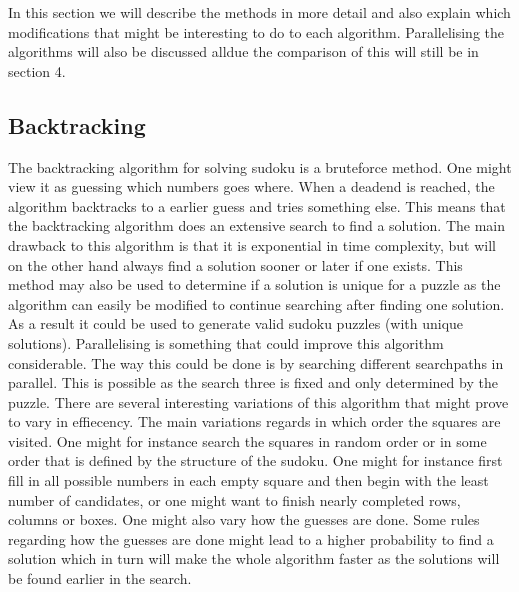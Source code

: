 \documentclass[a4paper,11pt]{kth-mag}
\begin{document}
In this section we will describe the methods in more detail and also explain which modifications that might be interesting to do to each algorithm. Parallelising the algorithms will also be discussed alldue the comparison of this will still be in section 4.

\subsection{Backtracking}

The backtracking algorithm for solving sudoku is a bruteforce method. One might view it as guessing which numbers goes where. When a deadend is reached, the algorithm backtracks to a earlier guess and tries something else. This means that the backtracking algorithm does an extensive search to find a solution. The main drawback to this algorithm is that it is exponential in time complexity, but will on the other hand always find a solution sooner or later if one exists. This method may also be used to determine if a solution is unique for a puzzle as the algorithm can easily be modified to continue searching after finding one solution. As a result it could be used to generate valid sudoku puzzles (with unique solutions).
\newline
Parallelising is something that could improve this algorithm considerable. The way this could be done is by searching different searchpaths in parallel. This is possible as the search three is fixed and only determined by the puzzle.
\newline
There are several interesting variations of this algorithm that might prove to vary in effiecency. The main variations regards in which order the squares are visited. One might for instance search the squares in random order or in some order that is defined by the structure of the sudoku. One might for instance first fill in all possible numbers in each empty square and then begin with the least number of candidates, or one might want to finish nearly completed rows, columns or boxes. One might also vary how the guesses are done. Some rules regarding how the guesses are done might lead to a higher probability to find a solution which in turn will make the whole algorithm faster as the solutions will be found earlier in the search.
\end{document}
